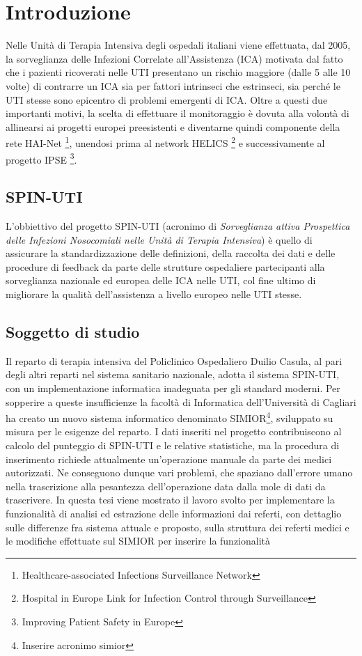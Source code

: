 \chapter{Introduzione}
Nelle Unità di Terapia Intensiva degli ospedali italiani viene effettuata, dal 2005, la sorveglianza delle Infezioni Correlate all'Assistenza (ICA) motivata dal fatto che i pazienti ricoverati nelle UTI presentano un rischio maggiore (dalle 5 alle 10 volte) di contrarre un ICA sia per fattori intrinseci che estrinseci, sia perché le UTI stesse sono epicentro di problemi emergenti di ICA. Oltre a questi due importanti motivi, la scelta di effettuare il monitoraggio è dovuta alla volontà di allinearsi ai progetti europei preesistenti e diventarne quindi componente della rete HAI-Net \footnote{Healthcare-associated Infections Surveillance Network},  
unendosi prima al network HELICS \footnote{Hospital in Europe Link for Infection Control through Surveillance} e successivamente al progetto IPSE \footnote{Improving Patient Safety in Europe}.
\section{SPIN-UTI}
L'obbiettivo del progetto SPIN-UTI (acronimo di \textit{Sorveglianza attiva Prospettica delle Infezioni Nosocomiali nelle Unità di Terapia Intensiva}) è quello di assicurare la standardizzazione delle definizioni, della raccolta dei dati e delle procedure di feedback da parte delle strutture ospedaliere partecipanti alla sorveglianza nazionale ed europea delle ICA nelle UTI, col fine ultimo di migliorare la qualità dell'assistenza a livello europeo nelle UTI stesse.
\newpage
\section{Soggetto di studio}
Il reparto di terapia intensiva del Policlinico Ospedaliero Duilio Casula, al pari degli altri reparti nel sistema sanitario nazionale, adotta il sistema SPIN-UTI, con un 
implementazione informatica inadeguata per gli standard moderni. Per sopperire a queste insufficienze la facoltà di Informatica dell'Università di Cagliari ha creato un nuovo sistema informatico denominato SIMIOR\footnote{Inserire acronimo simior}, sviluppato su misura per le esigenze del reparto. I dati inseriti nel progetto contribuiscono al calcolo del punteggio di SPIN-UTI e le relative statistiche, ma la procedura di inserimento richiede attualmente un'operazione manuale da parte dei medici autorizzati. Ne conseguono dunque vari problemi, che spaziano dall'errore umano nella trascrizione alla pesantezza dell'operazione data dalla mole di dati da trascrivere.
In questa tesi viene mostrato il lavoro svolto per implementare la funzionalità di analisi ed estrazione delle informazioni dai referti, con dettaglio sulle differenze fra sistema attuale e proposto, sulla struttura dei referti medici e le modifiche effettuate sul SIMIOR per inserire la funzionalità